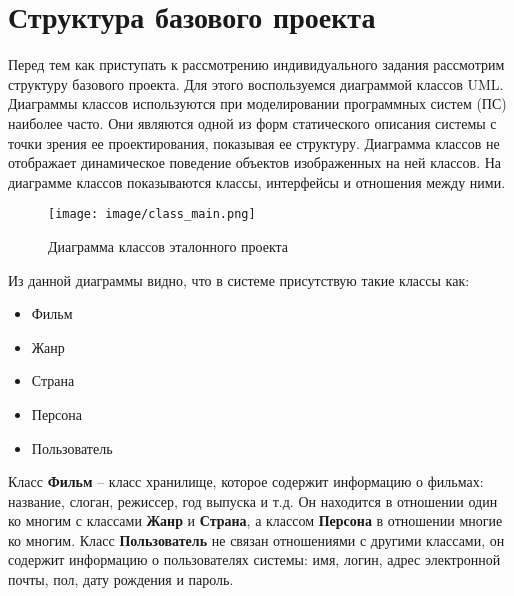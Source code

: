 ﻿\section{Структура базового проекта}
Перед тем как приступать к рассмотрению индивидуального задания рассмотрим структуру базового проекта. Для этого воспользуемся диаграммой классов UML. Диаграммы классов используются при моделировании программных систем (ПС) наиболее часто. Они являются одной из форм статического описания системы с точки зрения ее проектирования, показывая ее структуру. Диаграмма классов не отображает динамическое поведение объектов изображенных на ней классов. На диаграмме классов показываются классы, интерфейсы и отношения между ними.

\begin{figure}[h!]
\begin{center}
\texttt{[image: image/class\_main.png]}
\end{center}
\caption{Диаграмма классов эталонного проекта}
\end{figure}

Из данной диаграммы видно, что в системе присутствую такие классы как:

\begin{itemize}
\item Фильм
\item Жанр
\item Страна
\item Персона
\item Пользователь
\end{itemize}

Класс \textbf{Фильм} -- класс хранилище, которое содержит информацию о фильмах: название, слоган, режиссер, год выпуска и т.д. Он находится в отношении один ко многим с классами \textbf{Жанр} и \textbf{Страна}, а классом \textbf{Персона} в отношении многие ко многим. Класс \textbf{Пользователь} не связан отношениями с другими классами, он содержит информацию о пользователях системы: имя, логин, адрес электронной почты, пол, дату рождения и пароль.

\endinput





